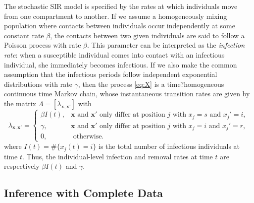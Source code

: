 \documentclass[12pt]{article}
\begin{document}
The stochastic SIR model is specified by the rates at which individuals move from one compartment to another. If we assume a homogeneously mixing population where contacts between individuals occur independently at some constant rate $\beta$, the contacts between two given individuals are said to follow a Poisson process with rate $\beta$. This parameter can be interpreted as the \textit{infection rate}: when a susceptible individual comes into contact with an infectious individual, she immediately becomes infectious.
If we also make the common assumption that the infectious periods follow independent exponential distributions with rate $\gamma$, then the process \eqref{eq:X} is a time?homogeneous continuous time Markov chain, whose instantaneous transition rates
are given by the matrix $\Lambda = [\lambda_{\mathbf{x}, \mathbf{x}'}]$ with
\begin{equation}
	\label{eq:rate}
	\lambda_{\mathbf{x}, \mathbf{x}'} = 
	\begin{cases}
		\beta I(t), & \mathbf{x} \text{ and } \mathbf{x}' \text{ only differ at position } j \text{ with } x_j = s \text{ and } x_j' = i, \\
		\gamma, & \mathbf{x} \text{ and } \mathbf{x}' \text{ only differ at position } j \text{ with } x_j = i \text{ and } x_j' = r, \\
		0, & \text{ otherwise.}
	\end{cases}
\end{equation}
where $I(t) = \#\{x_j(t) = i\}$ is the total number of infectious individuals at time $t$. Thus, the individual-level infection and removal rates at time $t$ are respectively $\beta I(t)$ and $\gamma$.

\subsection{Inference with Complete Data}
\label{sec:icd}
\end{document}
